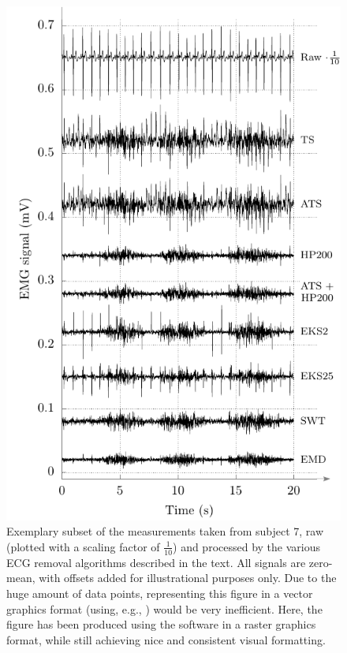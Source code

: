 \begin{figure}[htbp]
	\centering
	\includegraphics{figures/generated/emg-signals}
	\caption{Exemplary subset of the measurements taken from subject 7, raw (plotted with a scaling factor of $\frac{1}{10}$) and processed by the various ECG removal algorithms described in the text. All signals are zero-mean, with offsets added for illustrational purposes only.
	Due to the huge amount of data points, representing this figure in a vector graphics format (using, e.g., \pgfplots) would be very inefficient. 
	Here, the figure has been produced using the \gnuplot{} software in a raster graphics format, while still achieving nice and consistent visual formatting.}
	\label{fig:gnuplot-emg}
\end{figure}

